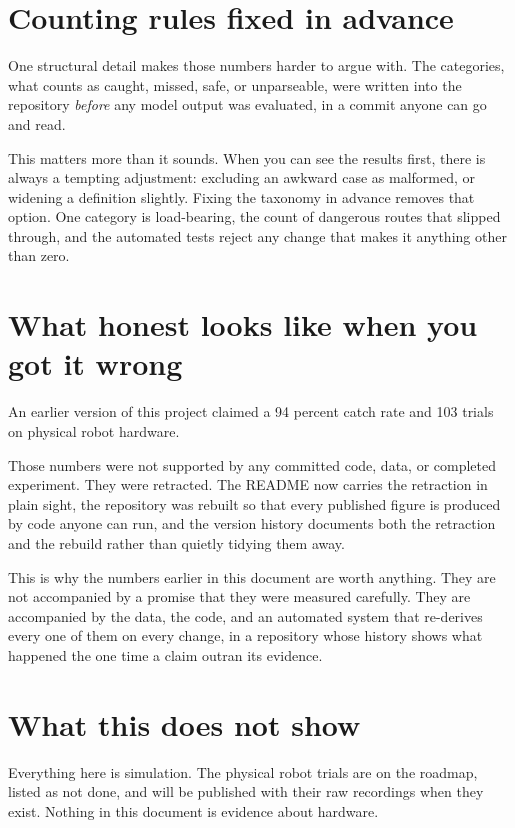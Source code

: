 \documentclass[11pt,a4paper]{article}
\begin{document}
\section{Counting rules fixed in advance}

One structural detail makes those numbers harder to argue with. The categories, what counts as caught, missed, safe, or unparseable, were written into the repository \emph{before} any model output was evaluated, in a commit anyone can go and read.

This matters more than it sounds. When you can see the results first, there is always a tempting adjustment: excluding an awkward case as malformed, or widening a definition slightly. Fixing the taxonomy in advance removes that option. One category is load-bearing, the count of dangerous routes that slipped through, and the automated tests reject any change that makes it anything other than zero.

\section{What honest looks like when you got it wrong}

An earlier version of this project claimed a 94 percent catch rate and 103 trials on physical robot hardware.

Those numbers were not supported by any committed code, data, or completed experiment. They were retracted. The README now carries the retraction in plain sight, the repository was rebuilt so that every published figure is produced by code anyone can run, and the version history documents both the retraction and the rebuild rather than quietly tidying them away.

\begin{quotebox}
This is why the numbers earlier in this document are worth anything. They are not accompanied by a promise that they were measured carefully. They are accompanied by the data, the code, and an automated system that re-derives every one of them on every change, in a repository whose history shows what happened the one time a claim outran its evidence.
\end{quotebox}

\section{What this does not show}

Everything here is simulation. The physical robot trials are on the roadmap, listed as not done, and will be published with their raw recordings when they exist. Nothing in this document is evidence about hardware.
\end{document}
